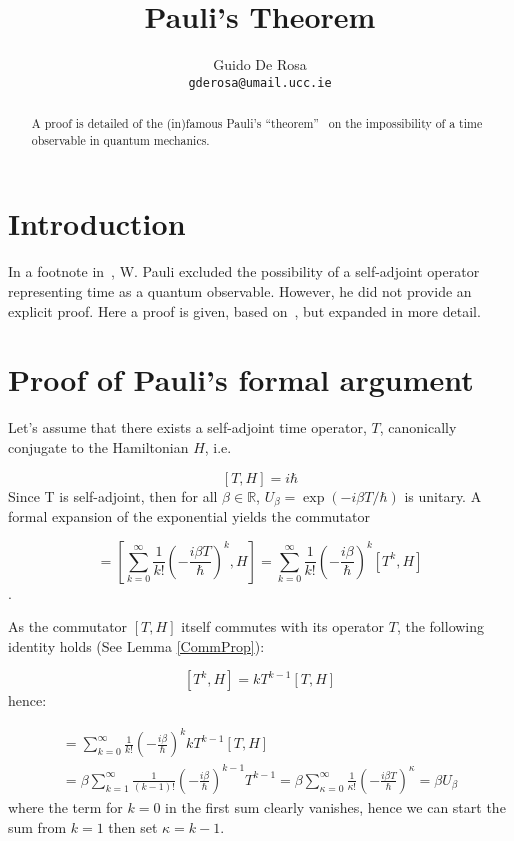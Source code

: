 \documentclass[a4paper]{article}
\author{Guido De Rosa \\ \small\tt{gderosa@umail.ucc.ie}}
\title{Pauli's Theorem}
\begin{document}
\maketitle

\begin{abstract}
A proof is detailed of the (in)famous Pauli's ``theorem''~\cite{PauliFootnote}
on the impossibility of a time observable in quantum mechanics.
\end{abstract}

\section{Introduction}

In a footnote in~\cite{PauliFootnote}, W. Pauli excluded the possibility
of a self-adjoint operator representing time as a quantum observable.
However, he did not provide an explicit proof.
Here a proof is given, based on~\cite{Galapon2002}, but expanded in more detail.

\section{Proof of Pauli's formal argument}\label{proof}

Let's assume that there exists a self-adjoint time operator, $T$, canonically conjugate
to the Hamiltonian $H$, i.e.

\begin{equation}
\label{THcommutator}
[T, H] = i\hbar
\end{equation}
Since T is self-adjoint, then for all
$\beta\in\mathbb{R}$, $U_{\beta} = \exp(- i \beta T / \hbar)$
is unitary. A formal
expansion of the exponential yields the commutator

\begin{equation}
[U_{\beta}, H]  = 
\left[
    \sum_{k=0}^{\infty} \frac{1}{k!} \left(- \frac{i\beta T}{\hbar} \right)^k, H
\right]         =
\sum_{k=0}^{\infty} \frac{1}{k!} \left(- \frac{i\beta}{\hbar} \right)^k [T^k, H]
\end{equation}.

As the commutator $[T, H]$ itself commutes with its operator $T$,
the following identity holds (See Lemma \ref{CommProp}):

$$
[T^k, H] = kT^{k-1}[T, H]
$$
hence:

\begin{multline}
[U_{\beta}, H]  = 
\sum_{k=0}^{\infty} \frac{1}{k!} \left(- \frac{i\beta}{\hbar} \right)^k kT^{k-1}[T, H] \\ =
\beta\sum_{k=1}^{\infty} \frac{1}{(k-1)!} \left(- \frac{i\beta}{\hbar} \right)^{k-1} T^{k-1} =
\beta\sum_{\kappa=0}^{\infty} \frac{1}{\kappa!} \left(- \frac{i\beta T}{\hbar} \right)^{\kappa}  =
\beta U_{\beta}
\end{multline}
where the term for $k=0$ in the first sum clearly vanishes, hence we can start the sum from 
$k=1$ then set $\kappa=k-1$.
\end{document}
